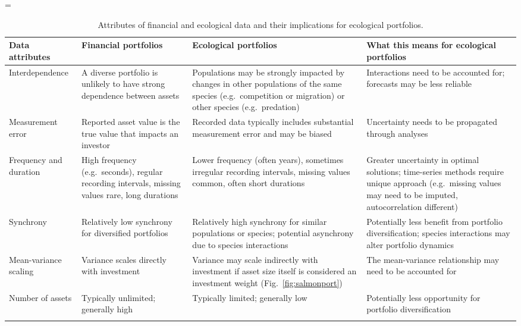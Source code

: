 \LTcapwidth=\textwidth
{}
\begin{footnotesize}

\begin{longtable}{>{\RaggedRight}p{2.7cm}>{\RaggedRight}p{3.3cm}>{\RaggedRight}p{3.9cm}>{\RaggedRight}p{4.2cm}}

\caption{Attributes of financial and ecological data and their implications for ecological portfolios.}\\
\toprule

\textbf{Data attributes} &
\textbf{Financial portfolios} &
\textbf{Ecological portfolios} &
\textbf{What this means for ecological portfolios}\\

\midrule

Interdependence &
A diverse portfolio is unlikely to have strong dependence between assets &
Populations may be strongly impacted by changes in other populations of the same species (e.g.\ competition or migration) or other species (e.g.\ predation) &
Interactions need to be accounted for; forecasts may be less reliable\\

Measurement error &
Reported asset value is the true value that impacts an investor &
Recorded data typically includes substantial measurement error and may be biased &
Uncertainty needs to be propagated through analyses\\

Frequency and duration &
High frequency (e.g.\ seconds), regular recording intervals, missing values rare, long durations &
Lower frequency (often years), sometimes irregular recording intervals, missing values common, often short durations &
Greater uncertainty in optimal solutions; time-series methods require unique approach (e.g.\ missing values may need to be imputed, autocorrelation different)\\

Synchrony &
Relatively low synchrony for diversified portfolios &
Relatively high synchrony for similar populations or species; potential asynchrony due to species interactions &
Potentially less benefit from portfolio diversification; species interactions may alter portfolio dynamics\\

Mean-variance scaling &
Variance scales directly with investment &
Variance may scale indirectly with investment if asset size itself is considered an investment weight (Fig.~\ref{fig:salmonport}) &
The mean-variance relationship may need to be accounted for\\

Number of assets &
Typically unlimited; generally high &
Typically limited; generally low &
Potentially less opportunity for portfolio diversification\\

\bottomrule
\label{tab:data}
\end{longtable}
\end{footnotesize}
